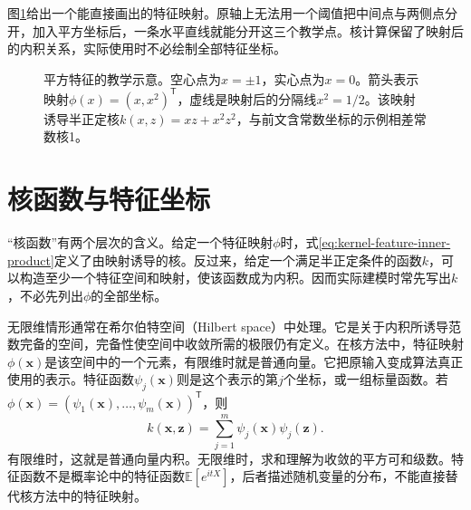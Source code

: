 图\ref{fig:kernel-explicit-quadratic}给出一个能直接画出的特征映射。原轴上无法用一个阈值把中间点与两侧点分开，加入平方坐标后，一条水平直线就能分开这三个教学点。核计算保留了映射后的内积关系，实际使用时不必绘制全部特征坐标。
\begin{figure}[htbp]
\centering
{}
\caption{平方特征的教学示意。空心点为$x=\pm1$，实心点为$x=0$。箭头表示映射$\phi(x)=(x,x^2)^{\mathsf T}$，虚线是映射后的分隔线$x^2=1/2$。该映射诱导半正定核$k(x,z)=xz+x^2z^2$，与前文含常数坐标的示例相差常数核1。}
\label{fig:kernel-explicit-quadratic}
\end{figure}

\section{核函数与特征坐标}
“核函数”有两个层次的含义。给定一个特征映射$\phi$时，式\eqref{eq:kernel-feature-inner-product}定义了由映射诱导的核。反过来，给定一个满足半正定条件的函数$k$，可以构造至少一个特征空间和映射，使该函数成为内积。因而实际建模时常先写出$k$，不必先列出$\phi$的全部坐标。

无限维情形通常在希尔伯特空间（Hilbert space）中处理。它是关于内积所诱导范数完备的空间，完备性使空间中收敛所需的极限仍有定义。在核方法中，特征映射$\phi(\bm x)$是该空间中的一个元素，有限维时就是普通向量。它把原输入变成算法真正使用的表示。特征函数$\psi_j(\bm x)$则是这个表示的第$j$个坐标，或一组标量函数。若$\phi(\bm x)=(\psi_1(\bm x),\ldots,\psi_m(\bm x))^{\mathsf T}$，则
\begin{equation}
 k(\bm x,\bm z)=\sum_{j=1}^{m}\psi_j(\bm x)\psi_j(\bm z).
 \label{eq:kernel-feature-functions}
\end{equation}
有限维时，这就是普通向量内积。无限维时，求和理解为收敛的平方可和级数。特征函数不是概率论中的特征函数$\mathbb E[e^{itX}]$，后者描述随机变量的分布，不能直接替代核方法中的特征映射。

